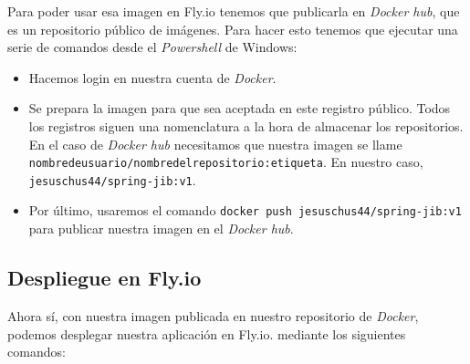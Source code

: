 Para poder usar esa imagen en Fly.io tenemos que publicarla en \textit{Docker hub}, que es un repositorio público de imágenes.
Para hacer esto tenemos que ejecutar una serie de comandos desde el \textit{Powershell} de Windows:

\begin{itemize}
\item Hacemos login en nuestra cuenta de \textit{Docker}.
\item Se prepara la imagen para que sea aceptada en este registro público. Todos los registros siguen una nomenclatura a la hora de almacenar los repositorios. En el caso de \textit{Docker hub} necesitamos que nuestra imagen se llame \texttt{nombredeusuario/nombredelrepositorio:etiqueta}. En nuestro caso, \texttt{jesuschus44/spring-jib:v1}.
\item Por último, usaremos el comando \texttt{docker push jesuschus44/spring-jib:v1} para publicar nuestra imagen en el \textit{Docker hub}.
\end{itemize}


\subsection{Despliegue en Fly.io}

Ahora sí, con nuestra imagen publicada en nuestro repositorio de \textit{Docker}, podemos desplegar nuestra aplicación en Fly.io. mediante los siguientes comandos:

